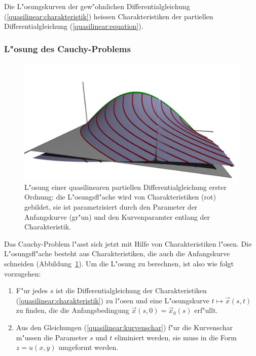 \begin{definition}
\label{def:quasiliniear:charakteristik}
Die L"osungskurven der gew"ohnlichen Differentialgleichung
(\ref{quasilinear:charakteristik}) heissen Charakteristiken
der partiellen Differentialgleichung (\ref{quasilinear:equation}).
\end{definition}

\subsubsection{L"osung des Cauchy-Problems}
\begin{figure}
\begin{center}
\includegraphics[width=\hsize]{3d/sol.jpg}
\end{center}
\caption{L"osung einer quasilinearen partiellen Differentialgleichung
erster Ordnung: die L"osungsfl"ache wird von Charakteristiken (rot) gebildet,
sie ist parametrisiert durch den Parameter der Anfangskurve (gr"un) und den
Kurvenparamter entlang der Charakteristik.
\label{geometrie:loesung-mit-charakteristiken}}
\end{figure}
Das Cauchy-Problem l"asst sich jetzt mit Hilfe von Charakteristiken
l"osen. Die L"osungsfl"ache besteht aus Charakteristiken, die auch
die Anfangskurve schneiden
(Abbildung~\ref{geometrie:loesung-mit-charakteristiken}).
Um die L"osung zu berechnen, ist also wie folgt vorzugehen:
\begin{enumerate}
\item
F"ur jedes $s$ ist die Differentialgleichung der Charakteristiken
(\ref{quasilinear:charakteristik}) zu l"osen und eine 
L"osungskurve $t\mapsto \vec x(s,t)$ zu finden, die
die Anfangsbedingung $\vec x(s,0)=\vec x_0(s)$ erf"ullt.
\item 
Aus den Gleichungen (\ref{quasilinear:kurvenschar}) f"ur die
Kurvenschar m"ussen die Parameter $s$ und $t$ eliminiert werden,
sie muss in die Form $z=u(x,y)$ umgeformt werden.
\end{enumerate}

